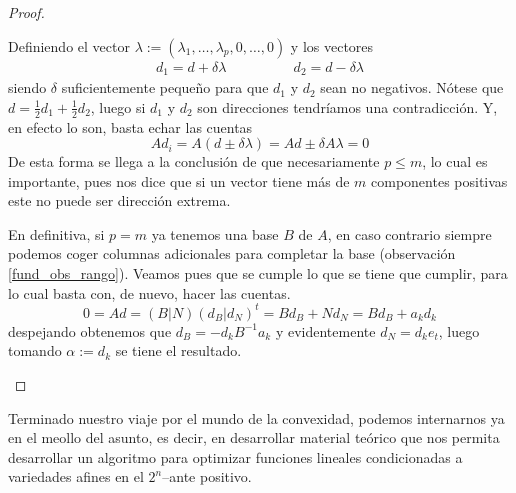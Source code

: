 \begin{proof}
\begin{itemize}
		Definiendo el vector $\lambda:=(\lambda_1,\dots,\lambda_p,0,\dots,0)$ y los vectores
		\begin{equation*}
			\begin{array}{cc}
			d_1=d+\delta\lambda\qquad&\qquad d_2=d-\delta\lambda
			\end{array}
		\end{equation*} siendo $\delta$ suficientemente pequeño para que $d_1$ y $d_2$ sean no negativos. Nótese que $d=\frac{1}{2}d_1+\frac{1}{2}d_2$, luego si $d_1$ y $d_2$ son direcciones tendríamos una contradicción. Y, en efecto lo son, basta echar las cuentas
		\begin{equation*}
			Ad_i=A(d\pm\delta\lambda)=Ad\pm\delta A\lambda=0
		\end{equation*}
		De esta forma se llega a la conclusión de que necesariamente $p\leq m$, lo cual es importante, pues nos dice que si un vector tiene más de $m$ componentes positivas este no puede ser dirección extrema.
		
		En definitiva, si $p=m$ ya tenemos una base $B$ de $A$, en caso contrario siempre podemos coger columnas adicionales para completar la base (observación \ref{fund_obs_rango}). Veamos pues que se cumple lo que se tiene que cumplir, para lo cual basta con, de nuevo, hacer las cuentas.
		\begin{equation*}
			0=Ad=(B|N)(d_B|d_N)^t=Bd_B+Nd_N=Bd_B+a_kd_k
		\end{equation*}
		despejando obtenemos que $d_B=-d_kB^{-1}a_k$ y evidentemente $d_N=d_ke_t$, luego tomando $\alpha:=d_k$ se tiene el resultado.\qedhere
	\end{itemize}
\end{proof}
Terminado nuestro viaje por el mundo de la convexidad, podemos internarnos ya en el meollo del asunto, es decir, en desarrollar material teórico que nos permita desarrollar un algoritmo para optimizar funciones lineales condicionadas a variedades afines en el $2^n$--ante positivo.
